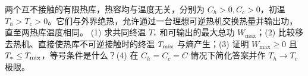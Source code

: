 两个互不接触的有限热库，热容均与温度无关，分别为 \(C_h>0,C_c>0\)，初温 \(T_h>T_c>0\)。它们与外界绝热，允许通过一台理想可逆热机交换热量并输出功，直至两热库温度相同。
(1) 求共同终温 \(T_*\) 和可输出的最大总功 \(W_{\max}\)；(2) 比较移去热机、直接使热库不可逆接触时的终温 \(T_{\rm mix}\) 与熵产生；(3) 证明 \(W_{\max}\ge0\) 且 \(T_*\le T_{\rm mix}\)，等号条件是什么？(4) 在 \(C_h=C_c=C\) 情况下简化答案并作 \(T_h\to T_c\) 极限。

